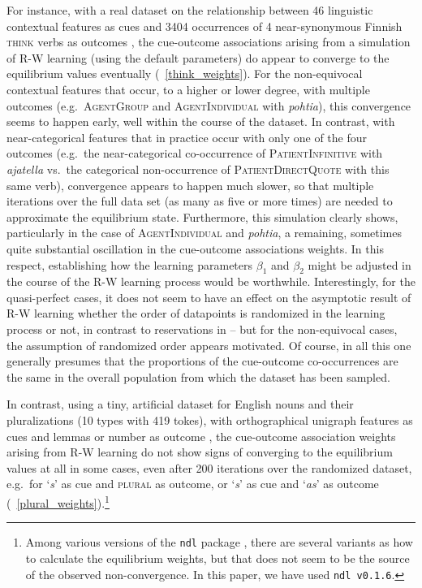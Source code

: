 \documentclass[conference]{IEEEtran}
\begin{document}
For instance, with a real dataset on the relationship between 46 linguistic contextual features as cues and 3404 occurrences of 4 near-synonymous Finnish \textsc{think} verbs as outcomes \cite{arppe2008, arppe2013, shaoul2014}, the cue-outcome associations arising from a simulation of R-W learning (using the default parameters) do appear to converge to the equilibrium values eventually (\figurename~\ref{think_weights}). For the non-equivocal contextual features that occur, to a higher or lower degree, with multiple outcomes (e.g.\ \textsc{AgentGroup} and \textsc{AgentIndividual} with \emph{pohtia}), this convergence seems to happen early, well within the course of the dataset. In contrast, with near-categorical features that in practice occur with only one of the four outcomes (e.g.\ the near-categorical co-occurrence of \textsc{PatientInfinitive} with \emph{ajatella} vs.\ the categorical non-occurrence of \textsc{PatientDirectQuote} with this same verb), convergence appears to happen much slower, so that multiple iterations over the full data set (as many as five or more times) are needed to approximate the equilibrium state.  Furthermore, this simulation clearly shows, particularly in the case of \textsc{AgentIndividual} and \emph{pohtia}, a remaining, sometimes quite substantial oscillation in the cue-outcome associations weights. In this respect, establishing how the learning parameters $\beta_1$ and $\beta_2$ might be adjusted in the course of the R-W learning process would be worthwhile. Interestingly, for the quasi-perfect cases, it does not seem to have an effect on the asymptotic result of R-W learning whether the order of datapoints is randomized in the learning process or not, in contrast to reservations in \cite[p.\ 119]{danks2003} -- but for the non-equivocal cases, the assumption of randomized order appears motivated. Of course, in all this one generally presumes that the proportions of the cue-outcome co-occurrences are the same in the overall population from which the dataset has been sampled.

In contrast, using a tiny, artificial dataset for English nouns and their pluralizations (10 types with 419 tokes), with orthographical unigraph features as cues and lemmas or number as outcome \cite[Fig.~4]{baayenetal2011}, the cue-outcome association weights arising from R-W learning do not show signs of converging to the equilibrium values at all in some cases, even after 200 iterations over the randomized dataset, e.g.\ for `\emph{s}' as cue and \textsc{plural} as outcome, or `\emph{s}' as cue and `\emph{as}' as outcome (\figurename~\ref{plural_weights}).\footnote{Among various versions of the \texttt{ndl} package \cite[v0.1.6 vs.\ 0.2.16]{shaoul2014}, there are several variants as how to calculate the equilibrium weights, but that does not seem to be the source of the observed non-convergence. In this paper, we have used \texttt{ndl v0.1.6}.}
\end{document}
